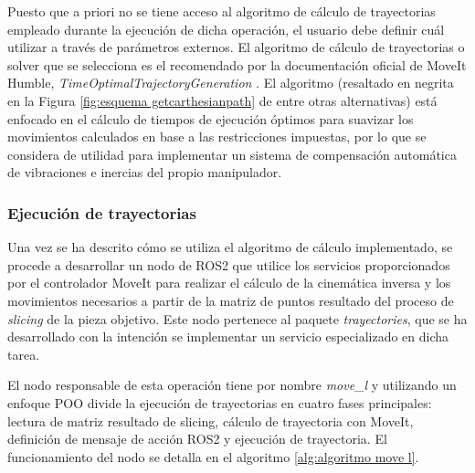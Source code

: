 Puesto que a priori no se tiene acceso al algoritmo de cálculo de trayectorias empleado durante la ejecución de dicha operación, el usuario debe definir cuál utilizar a través de parámetros externos. El algoritmo de cálculo de trayectorias o solver que se selecciona es el recomendado por la documentación oficial de MoveIt Humble, \textit{TimeOptimalTrajectoryGeneration} \cite{moveit_algoritmo_calculo_trayectoria}. El algoritmo (resaltado en negrita en la Figura \ref{fig:esquema getcarthesianpath} de entre otras alternativas) está enfocado en el cálculo de tiempos de ejecución óptimos para suavizar los movimientos calculados en base a las restricciones impuestas, por lo que se considera de utilidad para implementar un sistema de compensación automática de vibraciones e inercias del propio manipulador.

\subsubsection*{Ejecución de trayectorias}
\hypertarget{Ejecución de trayectorias}{}

Una vez se ha descrito cómo se utiliza el algoritmo de cálculo implementado, se procede a desarrollar un nodo de ROS2 que utilice los servicios proporcionados por el controlador MoveIt para realizar el cálculo de la cinemática inversa y los movimientos necesarios a partir de la matriz de puntos resultado del proceso de \textit{slicing} de la pieza objetivo. Este nodo pertenece al paquete \textit{trayectories}, que se ha desarrollado con la intención se implementar un servicio especializado en dicha tarea.

El nodo responsable de esta operación tiene por nombre \textit{move\_l} y utilizando un enfoque \acrshort{POO} divide la ejecución de trayectorias en cuatro fases principales: lectura de matriz resultado de slicing, cálculo de trayectoria con MoveIt, definición de mensaje de acción ROS2 y ejecución de trayectoria. El funcionamiento del nodo se detalla en el algoritmo \ref{alg:algoritmo move l}. 

